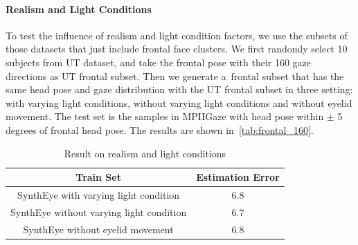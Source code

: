\paragraph{Realism and Light Conditions}
To test the influence of realism and light condition factors, we use the subsets of those datasets that just include frontal face clusters. We first randomly select 10 subjects from UT dataset, and take the frontal pose with their 160 gaze directions as UT frontal subset. Then we generate a~\dataset frontal subset that has the same head pose and gaze distribution with the UT frontal subset in three setting: with varying light conditions, without varying light conditions and without eyelid movement. The test set is the samples in MPIIGaze with head pose within $\pm$ 5 degrees of frontal head pose. The results are shown in~\autoref{tab:frontal_160}.

\begin{table}
\begin{center}
\begin{tabular}{ |c|c| } 
 \hline
 Train Set & Estimation Error \\ 
 \hline
 SynthEye with varying light condition & 6.8 \\ 
 \hline
 SynthEye without varying light condition & 6.7 \\ 
 \hline
 SynthEye without eyelid movement & 6.8 \\
 \hline
\end{tabular}
\caption{Result on realism and light conditions}
\label{tab:frontal_160}
\end{center}
\end{table}



